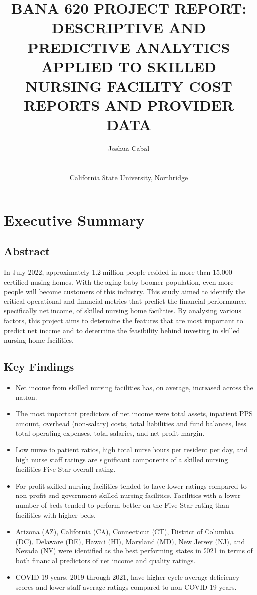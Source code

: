\documentclass{article}
\title{\textbf{BANA 620 PROJECT REPORT: DESCRIPTIVE AND PREDICTIVE ANALYTICS APPLIED TO SKILLED NURSING FACILITY COST REPORTS AND PROVIDER DATA}}
\author{Joshua Cabal \\ \\ \\California State University, Northridge \\}
\theoremstyle{mytheoremstyle}
\theoremstyle{mytheoremstyle}
\theoremstyle{myproblemstyle}
\begin{document}
    \maketitle
    \pagebreak
    \tableofcontents    
    \newpage


\section{Executive Summary}

\subsection{Abstract}

In July 2022, approximately 1.2 million people resided in more than 15,000 certified nusing homes. With the aging baby boomer population, even more people will become customers of this industry. This study aimed to identify the critical operational and financial metrics that predict the financial performance, specifically net income, of skilled nursing home facilities. By analyzing various factors, this project aims to determine the features that are most important to predict net income and to determine the feasibility behind investing in skilled nursing home facilities.

\subsection{Key Findings}

\begin{itemize}
    \item Net income from skilled nursing facilities has, on average, increased across the nation.
    \item The most important predictors of net income were total assets, inpatient PPS amount, overhead (non-salary) costs, total liabilities and fund balances, less total operating expenses, total salaries, and net profit margin.
    \item Low nurse to patient ratios, high total nurse hours per resident per day, and high nurse staff ratings are significant components of a skilled nursing facilities Five-Star overall rating. 
    \item For-profit skilled nursing facilities tended to have lower ratings compared to non-profit and government skilled nursing facilities. Facilities with a lower number of beds tended to perform better on the Five-Star rating than facilities with higher beds.
    \item Arizona (AZ), California (CA), Connecticut (CT), District of Columbia (DC), Delaware (DE), Hawaii (HI), Maryland (MD), New Jersey (NJ), and Nevada (NV) were identified as the best performing states in 2021 in terms of both financial predictors of net income and quality ratings.
    \item COVID-19 years, 2019 through 2021, have higher cycle average deficiency scores and lower staff average ratings compared to non-COVID-19 years. 
\end{itemize}
\end{document}
